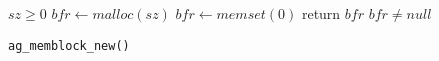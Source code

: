 
\kant[1]

\begin{wrapfigure}{r}{.6\textwidth}
\begin{minipage}{0.6\textwidth}
\vspace{-1em}
\begin{algorithm}[H]
\small
\caption{\texttt{ag\_memblock\_new()}}
\label{alg:ag_memblock_new}
\begin{algorithmic}
\Require $sz \geq 0$
\State $bfr \gets malloc(sz)$
\State $bfr \gets memset(0)$
\State return $bfr$
\EndProcedure
\Ensure $bfr \neq null$
\end{algorithmic}
\end{algorithm}
\end{minipage}
\end{wrapfigure}

\kant[2]

